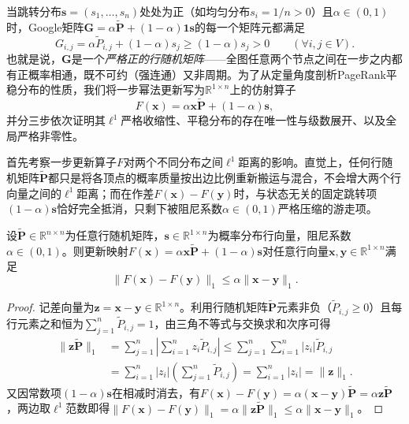 当跳转分布$\bm s=(s_1,\ldots,s_n)$处处为正（如均匀分布$s_i=1/n>0$）且$\alpha\in(0,1)$时，Google矩阵$\bm G=\alpha\widetilde{\bm P}+(1-\alpha)\bm 1\bm s$的每一个矩阵元都满足
\[
  G_{i,j} = \alpha\widetilde P_{i,j} + (1-\alpha)s_j \geq (1-\alpha)s_j > 0\qquad(\forall i,j\in V).
\]
也就是说，$\bm G$是一个\emph{严格正的行随机矩阵}——全图任意两个节点之间在一步之内都有正概率相通，既不可约（强连通）又非周期。为了从定量角度剖析PageRank平稳分布的性质，我们将一步幂法更新写为$\mathbb R^{1\times n}$上的仿射算子
\[
  F(\bm x) = \alpha\bm x\widetilde{\bm P} + (1-\alpha)\bm s,
\]
并分三步依次证明其$\ell^1$严格收缩性、平稳分布的存在唯一性与级数展开、以及全局严格非零性。

首先考察一步更新算子$F$对两个不同分布之间$\ell^1$距离的影响。直觉上，任何行随机矩阵$\widetilde{\bm P}$都只是将各顶点的概率质量按出边比例重新搬运与混合，不会增大两个行向量之间的$\ell^1$距离；而在作差$F(\bm x)-F(\bm y)$时，与状态无关的固定跳转项$(1-\alpha)\bm s$恰好完全抵消，只剩下被阻尼系数$\alpha\in(0,1)$严格压缩的游走项。

\begin{theorem}
\label{thm:graph-pagerank-contraction}
设$\widetilde{\bm P}\in\mathbb R^{n\times n}$为任意行随机矩阵，$\bm s\in\mathbb R^{1\times n}$为概率分布行向量，阻尼系数$\alpha\in(0,1)$。则更新映射$F(\bm x)=\alpha\bm x\widetilde{\bm P}+(1-\alpha)\bm s$对任意行向量$\bm x,\bm y\in\mathbb R^{1\times n}$满足
\begin{equation}
\lVert F(\bm{x})-F(\bm{y})\rVert_1
\le\alpha\lVert\bm{x}-\bm{y}\rVert_1.
\label{eq:graph-pagerank-contraction}
\end{equation}
\end{theorem}

\begin{proof}
记差向量为$\bm z=\bm x-\bm y\in\mathbb R^{1\times n}$。利用行随机矩阵$\widetilde{\bm P}$元素非负（$\widetilde P_{i,j}\geq 0$）且每行元素之和恒为$\sum_{j=1}^n\widetilde P_{i,j}=1$，由三角不等式与交换求和次序可得
\[
\begin{aligned}
  \lVert\bm z\widetilde{\bm P}\rVert_1
  &=\sum_{j=1}^n\left|\sum_{i=1}^n z_i\widetilde P_{i,j}\right|
  \leq\sum_{j=1}^n\sum_{i=1}^n|z_i|\widetilde P_{i,j}\\
  &=\sum_{i=1}^n|z_i|\left(\sum_{j=1}^n\widetilde P_{i,j}\right)
  =\sum_{i=1}^n|z_i|=\lVert\bm z\rVert_1.
\end{aligned}
\]
又因常数项$(1-\alpha)\bm s$在相减时消去，有$F(\bm x)-F(\bm y)=\alpha(\bm x-\bm y)\widetilde{\bm P}=\alpha\bm z\widetilde{\bm P}$，两边取$\ell^1$范数即得$\lVert F(\bm x)-F(\bm y)\rVert_1=\alpha\lVert\bm z\widetilde{\bm P}\rVert_1\leq\alpha\lVert\bm x-\bm y\rVert_1$。
\end{proof}

